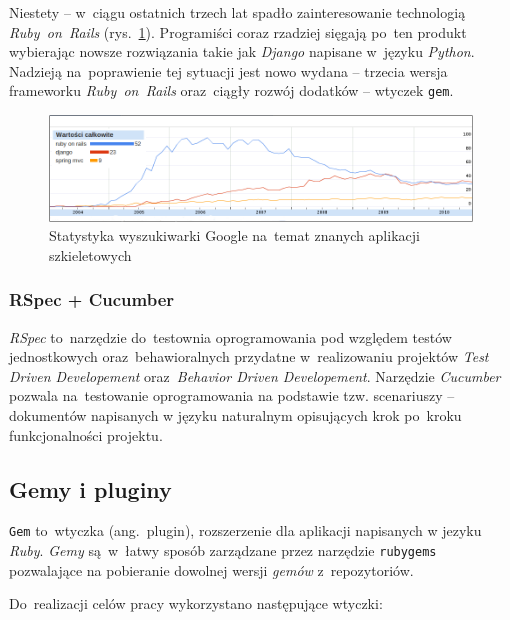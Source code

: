 Niestety -- w~ciągu ostatnich trzech lat spadło zainteresowanie technologią \textit{Ruby~on~Rails} (rys.~\ref{fig.wykres.googleresearch}). Programiści coraz rzadziej sięgają po~ten produkt wybierając nowsze rozwiązania takie jak \textit{Django}\cite{djangoproject} napisane w~języku \textit{Python}\cite{python}. Nadzieją na~poprawienie tej sytuacji jest nowo wydana -- trzecia wersja frameworku \textit{Ruby~on~Rails} oraz~ciągły rozwój dodatków -- wtyczek \texttt{gem}.

\begin{figure}[!t]
\centering
\includegraphics[width=\textwidth]{obrazki/googleresearch.png}
\caption{Statystyka wyszukiwarki Google na~temat znanych aplikacji szkieletowych\cite{google.stats}}
\label{fig.wykres.googleresearch}
\end{figure}

\subsubsection{RSpec + Cucumber}

\textit{RSpec}\cite{rspec} to~narzędzie do~testownia oprogramowania pod względem testów jednostkowych oraz~behawioralnych przydatne w~realizowaniu projektów \textit{Test Driven Developement} oraz~\textit{Behavior Driven Developement}. Narzędzie \textit{Cucumber}\cite{cucumber} pozwala na~testowanie oprogramowania na podstawie tzw. scenariuszy -- dokumentów napisanych w języku naturalnym opisujących krok po~kroku funkcjonalności projektu.


\subsection{Gemy i pluginy} \label{technologie.gemy}

\texttt{Gem} to~wtyczka (ang.~plugin), rozszerzenie dla aplikacji napisanych w jezyku \textit{Ruby}. \textit{Gemy} są~w~łatwy sposób zarządzane przez narzędzie \texttt{rubygems} pozwalające na pobieranie dowolnej wersji \textit{gemów} z~repozytoriów.


Do~realizacji celów pracy wykorzystano następujące wtyczki:

